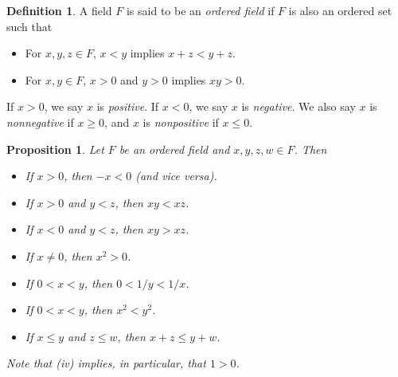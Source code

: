 \documentclass{article}
\newtheorem{proposition}{Proposition}[section]
\theoremstyle{definition}
\newtheorem{definition}{Definition}[section]
\theoremstyle{remark}
\begin{document}
\begin{definition}\label{def:ordered_field}
A field \( F \) is said to be an \textit{ordered field} if \( F \) is also an ordered set such that
\begin{itemize}
\item[(i)] For \( x, y, z \in F \), \( x < y \) implies \( x + z < y + z \).
\item[(ii)] For \( x, y \in F \), \( x > 0 \) and \( y > 0 \) implies \( xy > 0 \).
\end{itemize}
If \( x > 0 \), we say \( x \) is \textit{positive}. If \( x < 0 \), we say \( x \) is \textit{negative}. We also say \( x \) is \textit{nonnegative} if \( x \geq 0 \), and \( x \) is \textit{nonpositive} if \( x \leq 0 \).
\end{definition}
















\begin{proposition} \label{prop:ordered_field_properties}
Let \( F \) be an ordered field and \( x, y, z, w \in F \). Then
\begin{itemize}
\item[(i)] If \( x > 0 \), then \( -x < 0 \) (and vice versa).
\item[(ii)] If \( x > 0 \) and \( y < z \), then \( xy < xz \).
\item[(iii)] If \( x < 0 \) and \( y < z \), then \( xy > xz \).
\item[(iv)] If \( x \neq 0 \), then \( x^2 > 0 \).
\item[(v)] If \( 0 < x < y \), then \( 0 < 1/y < 1/x \).
\item[(vi)] If \( 0 < x < y \), then \( x^2 < y^2 \).
\item[(vii)] If \( x \leq y \) and \( z \leq w \), then \( x + z \leq y + w \).
\end{itemize}
Note that (iv) implies, in particular, that \( 1 > 0 \).\\
\end{proposition}
\end{document}
